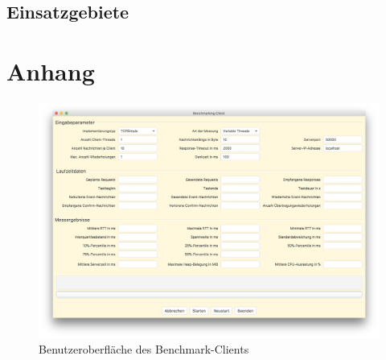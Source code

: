\documentclass[11pt,a4paper,titlepage]{scrartcl}
\numberwithin{equation}{section}
\begin{document}
\subsection{Einsatzgebiete}

\newpage
{}
\printbibliography
\newpage
\listoffigures
\newpage
\listoftables
\newpage
\lstlistoflistings
\newpage
\section*{Anhang}
\begin{figure}[ht] \label{fig:dakoBenchClientUI}
	\begin{center}
		\includegraphics[scale=0.17]{img/benchClientUI.jpg}
		\caption[]{Benutzeroberfläche des Benchmark-Clients}
	\end{center}
\end{figure}
\end{document}
